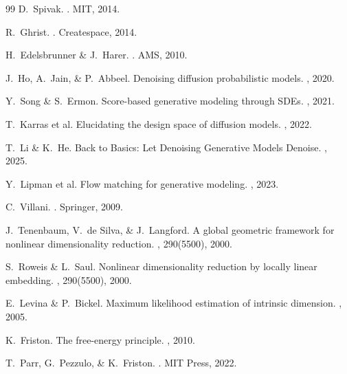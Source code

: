 \documentclass[11pt,a4paper,twocolumn]{article}
\begin{document}
\begin{thebibliography}{99}
D.~Spivak.
.
\newblock MIT, 2014.

R.~Ghrist.
.
\newblock Createspace, 2014.

H.~Edelsbrunner \& J.~Harer.
.
\newblock AMS, 2010.

J.~Ho, A.~Jain, \& P.~Abbeel.
\newblock Denoising diffusion probabilistic models.
, 2020.

Y.~Song \& S.~Ermon.
\newblock Score-based generative modeling through SDEs.
, 2021.

T.~Karras et al.
\newblock Elucidating the design space of diffusion models.
, 2022.

T.~Li \& K.~He.
\newblock Back to Basics: Let Denoising Generative Models Denoise.
, 2025.

Y.~Lipman et al.
\newblock Flow matching for generative modeling.
, 2023.

C.~Villani.
.
\newblock Springer, 2009.

J.~Tenenbaum, V.~de Silva, \& J.~Langford.
\newblock A global geometric framework for nonlinear dimensionality reduction.
, 290(5500), 2000.

S.~Roweis \& L.~Saul.
\newblock Nonlinear dimensionality reduction by locally linear embedding.
, 290(5500), 2000.

E.~Levina \& P.~Bickel.
\newblock Maximum likelihood estimation of intrinsic dimension.
, 2005.

K.~Friston.
\newblock The free-energy principle.
, 2010.

T.~Parr, G.~Pezzulo, \& K.~Friston.
.
\newblock MIT Press, 2022.


\end{thebibliography}
\end{document}

